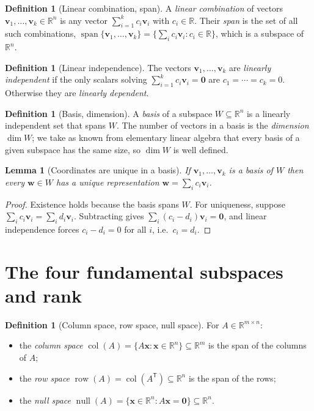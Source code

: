 \documentclass[11pt,oneside]{book}
\theoremstyle{plain}
\newtheorem{lemma}[theorem]{Lemma}
\theoremstyle{definition}
\newtheorem{definition}[theorem]{Definition}
\theoremstyle{remark}
\newcommand{\R}{\mathbb{R}}
\newcommand{\col}{\operatorname{col}}
\newcommand{\row}{\operatorname{row}}
\newcommand{\nul}{\operatorname{null}}
\newcommand{\spn}{\operatorname{span}}
\newcommand{\dimm}{\operatorname{dim}}
\newcommand{\T}{^{\mathsf T}}
\newcommand{\bv}{\mathbf{v}}
\newcommand{\bw}{\mathbf{w}}
\newcommand{\bx}{\mathbf{x}}
\newcommand{\bzero}{\mathbf{0}}
\begin{document}
\begin{definition}[Linear combination, span]
A \emph{linear combination} of vectors $\bv_1,\dots,\bv_k\in\R^n$ is any vector
$\sum_{i=1}^k c_i\bv_i$ with $c_i\in\R$. Their \emph{span} is the set of all such
combinations,
$\spn\{\bv_1,\dots,\bv_k\}=\{\sum_i c_i\bv_i: c_i\in\R\}$,
which is a subspace of $\R^n$.
\end{definition}

\begin{definition}[Linear independence]
The vectors $\bv_1,\dots,\bv_k$ are \emph{linearly independent} if the only scalars
solving $\sum_{i=1}^k c_i\bv_i=\bzero$ are $c_1=\cdots=c_k=0$. Otherwise they are
\emph{linearly dependent}.
\end{definition}

\begin{definition}[Basis, dimension]
A \emph{basis} of a subspace $W\subseteq\R^n$ is a linearly independent set that spans
$W$. The number of vectors in a basis is the \emph{dimension} $\dimm W$; we take as
known from elementary linear algebra that every basis of a given subspace has the same
size, so $\dimm W$ is well defined.
\end{definition}

\begin{lemma}[Coordinates are unique in a basis]\label{lem:uniquecoord}
If $\bv_1,\dots,\bv_k$ is a basis of $W$ then every $\bw\in W$ has a \emph{unique}
representation $\bw=\sum_i c_i\bv_i$.
\end{lemma}
\begin{proof}
Existence holds because the basis spans $W$. For uniqueness, suppose
$\sum_i c_i\bv_i=\sum_i d_i\bv_i$. Subtracting gives $\sum_i(c_i-d_i)\bv_i=\bzero$, and
linear independence forces $c_i-d_i=0$ for all $i$, i.e.\ $c_i=d_i$.
\end{proof}

\section{The four fundamental subspaces and rank}

\begin{definition}[Column space, row space, null space]
For $A\in\R^{m\times n}$:
\begin{itemize}[leftmargin=1.5em]
\item the \emph{column space} $\col(A)=\{A\bx:\bx\in\R^n\}\subseteq\R^m$ is the span of
the columns of $A$;
\item the \emph{row space} $\row(A)=\col(A\T)\subseteq\R^n$ is the span of the rows;
\item the \emph{null space} $\nul(A)=\{\bx\in\R^n:A\bx=\bzero\}\subseteq\R^n$.
\end{itemize}
\end{definition}
\end{document}
